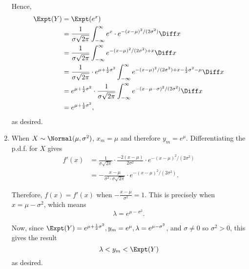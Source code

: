 \begin{enumerate}
          Hence,
          \begin{align*}
              \Expt(Y) & = \Expt(e^x)                                                                                                                                                      \\
                       & = \frac{1}{\sigma\sqrt{2\pi}} \int_{-\infty}^{\infty} e^x \cdot e^{-(x - \mu)^2 / (2\sigma^2)} \Diff x                                                            \\
                       & = \frac{1}{\sigma\sqrt{2\pi}} \int_{-\infty}^{\infty} e^{- (x - \mu)^2 / (2\sigma^2) + x} \Diff x                                                                 \\
                       & = \frac{1}{\sigma\sqrt{2\pi}} \cdot e^{\mu + \frac{1}{2}\sigma^2} \int_{-\infty}^{\infty} e^{- (x - \mu)^2 / (2\sigma^2) + x - \frac{1}{2}\sigma^2 - \mu} \Diff x \\
                       & = e^{\mu + \frac{1}{2}\sigma^2} \cdot \frac{1}{\sigma\sqrt{2\pi}} \int_{-\infty}^{\infty} e^{-(x - \mu - \sigma)^2 / (2\sigma^2)} \Diff x                         \\
                       & = e^{\mu + \frac{1}{2}\sigma^2},
          \end{align*}
          as desired.

    \item When \(X \sim \Normal(\mu, \sigma^2)\), \(x_m = \mu\) and therefore \(y_m = e^\mu\). Differentiating the p.d.f. for \(X\) gives
          \begin{align*}
              f'(x) & = \frac{1}{\sigma\sqrt{2\pi}} \cdot \frac{-2(x - \mu)}{2\sigma^2} \cdot e^{-(x - \mu)^2 / (2\sigma^2)} \\
                    & = - \frac{x - \mu}{\sigma^2 \cdot \sigma\sqrt{2\pi}} \cdot e^{-(x - \mu)^2 / (2\sigma^2)}.
          \end{align*}

          Therefore, \(f(x) = f'(x)\) when \(-\frac{x - \mu}{\sigma^2} = 1\). This is precisely when \(x = \mu - \sigma^2\), which means
          \[
              \lambda = e^{\mu - \sigma^2}.
          \]

          Now, since \(\Expt(Y) = e^{\mu + \frac{1}{2}\sigma^2}, y_m = e^\mu, \lambda = e^{\mu - \sigma^2}\), and \(\sigma \neq 0\) so \(\sigma^2 > 0\), this gives the result
          \[
              \lambda < y_m < \Expt(Y)
          \]
          as desired.
\end{enumerate}